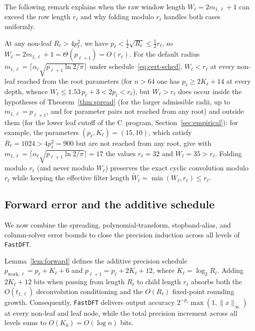 The following remark explains when the raw window length $W_\ell = 2m_{1,\ell} + 1$ can exceed the row length $r_\ell$ and why folding modulo $r_\ell$ handles both cases uniformly.

\begin{remark}\label{rem:folding}
At any non-leaf $R_\ell > 4 p_\ell^2$, we have $p_\ell < \frac{1}{2}\sqrt{R_\ell} \le \frac{1}{2} r_\ell$, so $W_\ell = 2m_{1,\ell} + 1 = \Theta(p_{\ell+1}) = O(r_\ell)$. For the default radius $m_{1,\ell} = \lceil \alpha_\ell\sqrt{p_{\ell+1}\ln 2 / \pi} \rceil$ under schedule~\eqref{eq:cert-sched}, $W_\ell < r_\ell$ at every non-leaf reached from the root parameters (for $n > 64$ one has $p_\ell \ge 2K_\ell + 14$ at every depth, whence $W_\ell \le 1.53\,p_\ell + 3 < 2p_\ell < r_\ell$), but $W_\ell > r_\ell$ does occur inside the hypotheses of Theorem~\ref{thm:spread} (for the larger admissible radii, up to $m_{1,\ell} = p_{\ell+1}$, and for parameter pairs not reached from any root) and outside them (for the lower leaf cutoff of the C~program, Section~\ref{sec:empirical}): for example, the parameters $(p_\ell, K_\ell) = (15, 10)$, which satisfy $R_\ell = 1024 > 4 p_\ell^2 = 900$ but are not reached from any root, give with $m_{1,\ell} = \lceil \alpha_\ell\sqrt{p_{\ell+1}\ln 2 / \pi} \rceil = 17$ the values $r_\ell = 32$ and $W_\ell = 35 > r_\ell$. Folding modulo $r_\ell$ (and never modulo $W_\ell$) preserves the exact cyclic convolution modulo $r_\ell$ while keeping the effective filter length $\tilde{W}_\ell = \min(W_\ell, r_\ell) \le r_\ell$.
\end{remark}

\subsection{Forward error and the additive schedule}\label{sec:forward-error}

We now combine the spreading, polynomial-transform, stopband-alias, and column-solver error bounds to close the precision induction across all levels of \texttt{FastDFT}.

Lemma~\ref{lem:forward} defines the additive precision schedule $p_{\mathrm{work},\ell} = p_\ell + K_\ell + 6$ and $p_{\ell+1} = p_\ell + 2K_\ell + 12$, where $K_\ell = \log_2 R_\ell$. Adding $2K_\ell + 12$ bits when passing from length $R_\ell$ to child length $r_\ell$ absorbs both the $O(t_{1,\ell})$ deconvolution conditioning and the $O(R_\ell)$ fixed-point rounding growth. Consequently, \texttt{FastDFT} delivers output accuracy $2^{-p_\ell}\max(1, \|x\|_\infty)$ at every non-leaf and leaf node, while the total precision increment across all levels sums to $O(K_0) = O(\log n)$ bits.

